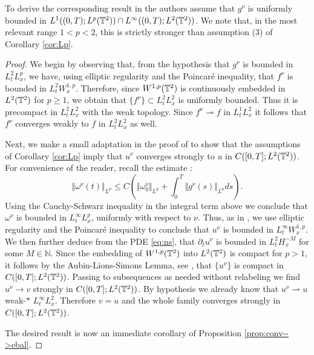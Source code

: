 \documentclass[reqno,12pt]{amsart}
\begin{document}
\begin{remark}
  To derive the corresponding result in \cite[Thm. 2.4]{LN2022}  the authors assume that $g^\nu$ is uniformly bounded in $L^1((0,T);L^p(\mathbb{T}^2)) \cap L^\infty((0,T);L^2(\mathbb{T}^2))$. We note that,   in the most relevant range $1<p < 2$, this is  strictly stronger than assumption (3) of Corollary \ref{cor:Lp}.
\end{remark}


\begin{proof}
We begin by observing that, from the hypothesis that $g^\nu$ is bounded in $L^2_tL^p_x$, we have, using elliptic regularity and the Poincar\'e inequality, that $f^\nu$ is bounded in $L^2_t W^{1,p}_x$. Therefore, since $W^{1,p}(\mathbb{T}^2)$ is continuously embedded in $L^2(\mathbb{T}^2)$ for $p\geq 1$, we obtain that $\{f^\nu \} \subset L^2_tL^2_x$ is uniformly bounded. Thus it is precompact in $L^2_t L^2_x$ with the weak topology. Since $f^\nu \rightharpoonup f$ in $L^1_t L^2_x$ it follows that $f^\nu$ converges weakly to $f$ in $L^2_t L^2_x$ as well.

Next, we make a small adaptation in the proof of  \cite[Lemma 3.1]{LN2022} to show that  the assumptions of Corollary \ref{cor:Lp} imply that $u^\nu$ converges strongly to $u$ in $C([0,T];L^2(\mathbb{T}^2))$. For convenience of the reader, recall the estimate \cite[(3.3)]{LN2022}:
\[\Vert \omega^\nu (t) \Vert_{L^p} \leq C \left( \Vert \omega^\nu_0 \Vert_{L^p} + \int_0^T \Vert g^\nu (s) \Vert_{L^p} ds\right).\]
Using the Cauchy-Schwarz inequality in the integral term above we conclude that $\omega^\nu$ is bounded in $L^\infty_t L^p_x$, uniformly with respect to $\nu$. Thus, as in \cite[Lemma 3.1]{LN2022}, we use elliptic regularity and the Poincar\'e inequality to conclude that $u^\nu$ is bounded in $L^\infty_t W^{1,p}_x$. We then further deduce from the PDE \eqref{eq:ns}, that $\partial_t u^\nu$ is bounded in $L^2_t H^{-M}_x$ for some
$M \in \mathbb{N}$. Since the embedding of $W^{1,p}(\mathbb{T}^2)$ into $L^2(\mathbb{T}^2)$ is compact for $p>1$, it follows by the Aubin-Lions-Simons Lemma, see \cite[Theorem II.5.16]{BoyerFabrie2013}, that $\{u^\nu\}$ is compact in $C([0,T];L^2(\mathbb{T}^2))$. Passing to subsequences as needed without relabeling we find $u^\nu \to v$  strongly in $C([0,T];L^2(\mathbb{T}^2))$. By hypothesis we already know that $u^\nu \rightharpoonup u$ weak-$\ast$ $L^\infty_t L^2_x$. Therefore $v=u$ and the whole family converges strongly in $C([0,T];L^2(\mathbb{T}^2))$.

The desired result is now an immediate corollary of Proposition \ref{prop:conv-->ebal}.
\end{proof}
\end{document}
